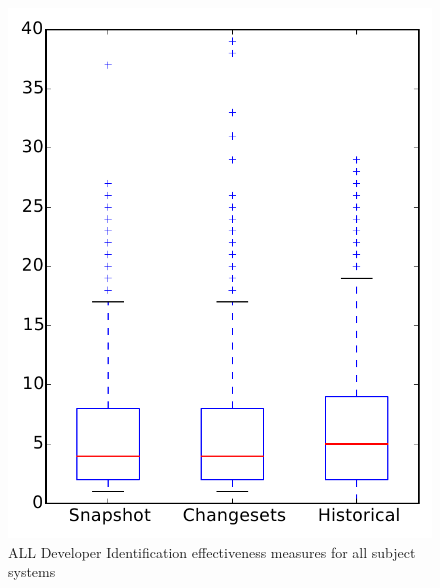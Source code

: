 
\begin{figure}
\centering
\includegraphics[height=0.4\textheight]{figures/dit/all_overview}
\caption{ALL Developer Identification effectiveness measures for all subject systems}
\label{fig:dit:all:overview}
\end{figure}
